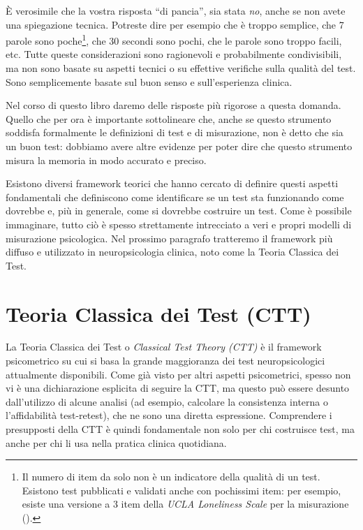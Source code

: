 \documentclass[
  italian,
  letterpaper,
  paper=A4,
  headinclude=on,
  footinclude=on,
  12pt]{scrbook}
\begin{document}
È verosimile che la vostra risposta ``di pancia'', sia stata \emph{no},
anche se non avete una spiegazione tecnica. Potreste dire per esempio
che è troppo semplice, che 7 parole sono poche\footnote{Il numero di
  item da solo non è un indicatore della qualità di un test. Esistono
  test pubblicati e validati anche con pochissimi item: per esempio,
  esiste una versione a 3 item della \emph{UCLA Loneliness Scale} per la
  misurazione (\cite{gosling2024measuring}).}, che 30 secondi sono
pochi, che le parole sono troppo facili, etc. Tutte queste
considerazioni sono ragionevoli e probabilmente condivisibili, ma non
sono basate su aspetti tecnici o su effettive verifiche sulla qualità
del test. Sono semplicemente basate sul buon senso e sull'esperienza
clinica.

Nel corso di questo libro daremo delle risposte più rigorose a questa
domanda. Quello che per ora è importante sottolineare che, anche se
questo strumento soddisfa formalmente le definizioni di test e di
misurazione, non è detto che sia un buon test: dobbiamo avere altre
evidenze per poter dire che questo strumento misura la memoria in modo
accurato e preciso.

Esistono diversi framework teorici che hanno cercato di definire questi
aspetti fondamentali che definiscono come identificare se un test sta
funzionando come dovrebbe e, più in generale, come si dovrebbe costruire
un test. Come è possibile immaginare, tutto ciò è spesso strettamente
intrecciato a veri e propri modelli di misurazione psicologica. Nel
prossimo paragrafo tratteremo il framework più diffuso e utilizzato in
neuropsicologia clinica, noto come la Teoria Classica dei Test.

\section{Teoria Classica dei Test (CTT)}\label{teoria-classica-dei-test}

La Teoria Classica dei Test o \emph{Classical Test Theory (CTT)} è il
framework psicometrico su cui si basa la grande maggioranza dei test
neuropsicologici attualmente disponibili. Come già visto per altri
aspetti psicometrici, spesso non vi è una dichiarazione esplicita di
seguire la CTT, ma questo può essere desunto dall'utilizzo di alcune
analisi (ad esempio, calcolare la consistenza interna o l'affidabilità
test-retest), che ne sono una diretta espressione. Comprendere i
presupposti della CTT è quindi fondamentale non solo per chi costruisce
test, ma anche per chi li usa nella pratica clinica quotidiana.
\end{document}
